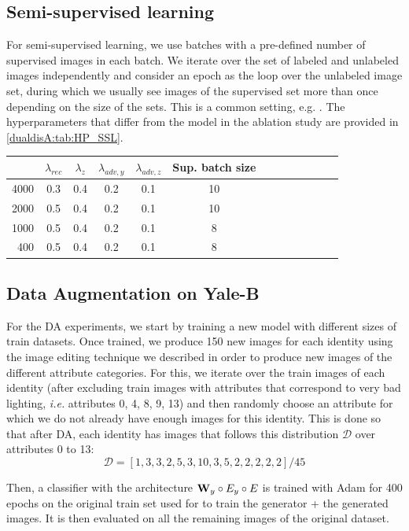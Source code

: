 \subsection{Semi-supervised learning}

For semi-supervised learning, we use batches with a pre-defined number of supervised images in each batch. We iterate over the set of labeled and unlabeled images independently and consider an epoch as the loop over the unlabeled image set, during which we usually see images of the supervised set more than once depending on the size of the sets. This is a common setting, e.g. \citep{Sajjadi2016,tarvainen2017mean,Robert2018}. The hyperparameters that differ from the model in the ablation study are provided in \autoref{dualdisA:tab:HP_SSL}.

\begin{table}[H]
    \centering
    \begin{tabular}{rcccccccccccc}
        \toprule
        & $\lambda_{rec}$ &  $\lambda_{z}$ & $\lambda_{adv,y}$ & $\lambda_{adv,z}$ & Sup. batch size \\
        \midrule
        4000     & 0.3 & 0.4 & 0.2  & 0.1 & 10 \\
        2000     & 0.5 & 0.4 & 0.2  & 0.1 & 10 \\
        1000     & 0.5 & 0.4 & 0.2  & 0.1 & 8 \\
        400      & 0.5 & 0.4 & 0.2  & 0.1 & 8 \\
        
        \bottomrule
    \end{tabular}
    \label{dualdisA:tab:HP_SSL}
\end{table}


\subsection{Data Augmentation on Yale-B}

For the \acf{DA} experiments, we start by training a new model with different sizes of train datasets. Once trained, we produce 150 new images for each identity using the image editing technique we described in order to produce new images of the different attribute categories. For this, we iterate over the train images of each identity (after excluding train images with attributes that correspond to very bad lighting, \textit{i.e.} attributes 0, 4, 8, 9, 13) and then randomly choose an attribute for which we do not already have enough images for this identity. This is done so that after \ac{DA}, each identity has images that follows this distribution $\mathcal D$ over attributes 0 to 13:
\begin{equation}
    \mathcal D = [1, 3, 3, 2, 5, 3, 10, 3, 5, 2, 2, 2, 2, 2] / 45
\end{equation}

Then, a classifier with the architecture $\mathbf{W}_y \circ E_y \circ E$ is trained with Adam for 400 epochs on the original train set used for to train the generator + the generated images. It is then evaluated on all the remaining images of the original dataset.
